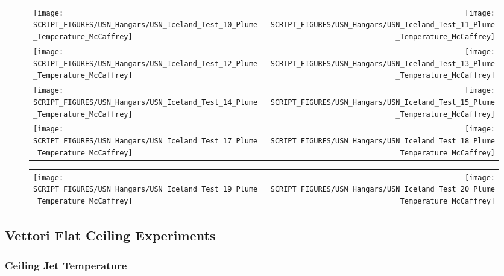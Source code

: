 \begin{figure}[p]
\begin{tabular*}{\textwidth}{l@{\extracolsep{\fill}}r}
\texttt{[image: SCRIPT\_FIGURES/USN\_Hangars/USN\_Iceland\_Test\_10\_Plume\_Temperature\_McCaffrey]} &
\texttt{[image: SCRIPT\_FIGURES/USN\_Hangars/USN\_Iceland\_Test\_11\_Plume\_Temperature\_McCaffrey]} \\
\texttt{[image: SCRIPT\_FIGURES/USN\_Hangars/USN\_Iceland\_Test\_12\_Plume\_Temperature\_McCaffrey]} &
\texttt{[image: SCRIPT\_FIGURES/USN\_Hangars/USN\_Iceland\_Test\_13\_Plume\_Temperature\_McCaffrey]} \\
\texttt{[image: SCRIPT\_FIGURES/USN\_Hangars/USN\_Iceland\_Test\_14\_Plume\_Temperature\_McCaffrey]} &
\texttt{[image: SCRIPT\_FIGURES/USN\_Hangars/USN\_Iceland\_Test\_15\_Plume\_Temperature\_McCaffrey]} \\
\texttt{[image: SCRIPT\_FIGURES/USN\_Hangars/USN\_Iceland\_Test\_17\_Plume\_Temperature\_McCaffrey]} &
\texttt{[image: SCRIPT\_FIGURES/USN\_Hangars/USN\_Iceland\_Test\_18\_Plume\_Temperature\_McCaffrey]}
\end{tabular*}
\end{figure}

\begin{figure}[p]
\begin{tabular*}{\textwidth}{l@{\extracolsep{\fill}}r}
\texttt{[image: SCRIPT\_FIGURES/USN\_Hangars/USN\_Iceland\_Test\_19\_Plume\_Temperature\_McCaffrey]} &
\texttt{[image: SCRIPT\_FIGURES/USN\_Hangars/USN\_Iceland\_Test\_20\_Plume\_Temperature\_McCaffrey]}
\end{tabular*}
\end{figure}

\clearpage

\subsection{Vettori Flat Ceiling Experiments}

\subsubsection{Ceiling Jet Temperature}

